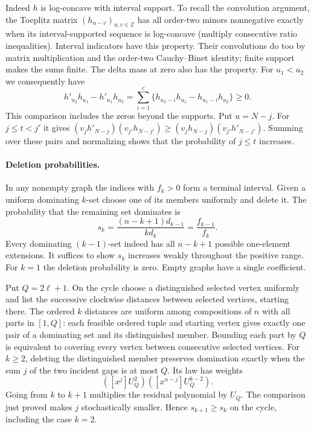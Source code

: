 \documentclass[11pt,a4paper]{article}
\numberwithin{equation}{section}
\begin{document}
Indeed $h$ is log-concave with interval support. To recall the
convolution argument, the Toeplitz matrix $(h_{u-v})_{u,v\in\mathbb Z}$
has all order-two minors nonnegative exactly when its interval-supported
sequence is log-concave (multiply consecutive ratio inequalities).
Interval indicators have this property. Their convolutions do too
by matrix multiplication and the order-two Cauchy--Binet identity;
finite support makes the sums finite. The delta mass at zero also has
the property. For $u_1<u_2$ we consequently have
\[
 h'_{u_2}h_{u_1}-h'_{u_1}h_{u_2}
 =\sum_{i=1}^{c}\{h_{u_2-i}h_{u_1}-h_{u_1-i}h_{u_2}\}\ge0.
\]
This comparison includes the zeros beyond the supports. Put $u=N-j$.
For $j\le t<j'$ it gives
$(v_jh'_{N-j})(v_{j'}h_{N-j'})\ge
(v_jh_{N-j})(v_{j'}h'_{N-j'})$. Summing over these pairs and
normalizing shows that the probability of $j\le t$ increases.

\paragraph{Deletion probabilities.}
In any nonempty graph the indices with $f_k>0$ form a terminal interval.
Given a uniform dominating $k$-set choose one of its members uniformly
and delete it. The probability that the remaining set dominates is
\[
 s_k=\frac{(n-k+1)d_{k-1}}{k d_k}=\frac{f_{k-1}}{f_k}.
\]
Every dominating $(k-1)$-set indeed has all $n-k+1$ possible
one-element extensions. It suffices to show $s_k$ increases weakly
throughout the positive range. For $k=1$ the deletion probability
is zero. Empty graphs have a single coefficient.

Put $Q=2\ell+1$. On the cycle choose a distinguished selected vertex
uniformly and list the successive clockwise distances between selected
vertices, starting there. The ordered $k$ distances are uniform among
compositions of $n$ with all parts in $[1,Q]$: each feasible ordered
tuple and starting vertex gives exactly one pair of a dominating set
and its distinguished member. Bounding each part by $Q$ is equivalent
to covering every vertex between consecutive selected vertices. For
$k\ge2$, deleting the distinguished member preserves domination exactly
when the sum $j$ of the two incident gaps is at most $Q$. Its law has
weights
\[
 ([x^j]U_Q^2)([x^{n-j}]U_Q^{k-2}).
\]
Going from $k$ to $k+1$ multiplies the residual polynomial by $U_Q$.
The comparison just proved makes $j$ stochastically smaller. Hence
$s_{k+1}\ge s_k$ on the cycle, including the case $k=2$.
\end{document}

